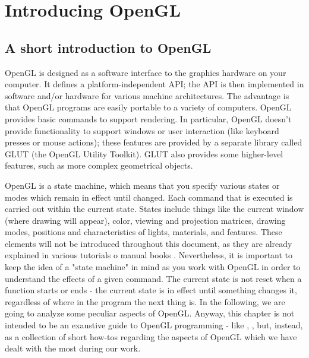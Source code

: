 \section{Introducing OpenGL}
\label{sec:opengl}
\lstset{language=C++}
\subsection{A short introduction to OpenGL}
OpenGL is designed as a software interface to the graphics 
hardware on your computer. It defines a platform-independent API;
the API is then implemented in software and/or hardware for 
various machine architectures. The advantage is that OpenGL 
programs are easily portable to a variety of computers. 
OpenGL provides basic commands to support rendering. 
In particular, OpenGL doesn't provide functionality to support
windows or user interaction (like keyboard presses or mouse 
actions); these features are provided by a separate library called
GLUT (the OpenGL Utility Toolkit). GLUT also provides some 
higher-level features, such as more complex geometrical objects.
%

%
OpenGL is a state machine, which means that you specify various 
states or modes which remain in effect until changed.
Each command that is executed is carried out within the current 
state. States include things like the current window (where
drawing will appear), color, viewing and projection matrices, 
drawing modes, positions and characteristics of lights,
materials, and features. These elements will not be introduced 
throughout this document, as they are already explained in
various tutorials \cite{opengl:brieftutorial} o manual books 
\cite{opengl:redbook}.
%
Nevertheless, it is important to keep the idea of a 
"state machine" in mind as you work with OpenGL in order to 
understand the effects of a given command. The current state 
is not reset when a function starts or ends - the current state
is in effect until something changes it, regardless of where 
in the program the next thing is. 
%
In the following, we are going to analyze some peculiar 
aspects of OpenGL. Anyway, this chapter is not intended 
to be an exaustive guide to OpenGL programming 
- like \cite{opengl:distilled}, \cite{opengl:redbook}, but,
instead, as a collection of short how-tos regarding the 
aspects of OpenGL which we have dealt with the most 
during our work. 
%
